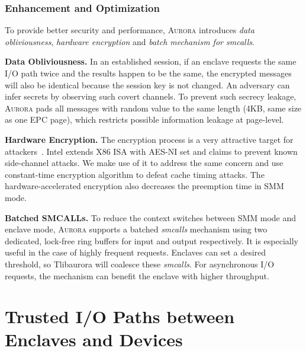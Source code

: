 \subsubsection{Enhancement and Optimization}
To provide better security and performance, \textsc{Aurora} introduces \textit{data obliviousness}, \textit{hardware encryption} and \textit{batch mechanism for smcalls}. 

\textbf{Data Obliviousness.}
In an established session, if an enclave requests the same I/O path twice and the results happen to be the same, the encrypted messages will also be identical because the session key is not changed. An adversary can infer secrets by observing such covert channels. To prevent such secrecy leakage, \textsc{Aurora} pads all messages with random value to the same length (4KB, same size as one EPC page), which restricts possible information leakage at page-level. %

\textbf{Hardware Encryption.} The encryption process is a very attractive target for attackers~\cite{DBLP:conf/acns/BiryukovDC17}. Intel extends X86 ISA with AES-NI set and claims to prevent known side-channel attacks. We make use of it to address the same concern and use constant-time encryption algorithm to defeat cache timing attacks. The hardware-accelerated encryption also decreases the preemption time in SMM mode.

\textbf{Batched SMCALLs.}\label{batch}
To reduce the context switches between SMM mode and enclave mode, \textsc{Aurora} supports a batched \textit{smcalls} mechanism using two dedicated, lock-free ring buffers for input and output respectively. It is especially useful in the case of highly frequent requests. Enclaves can set a desired threshold, so Tlibaurora will coalesce these \textit{smcalls}. For asynchronous I/O requests, the mechanism can benefit the enclave with higher throughput. %

\section{Trusted I/O Paths between Enclaves and Devices}\label{tpaths}

